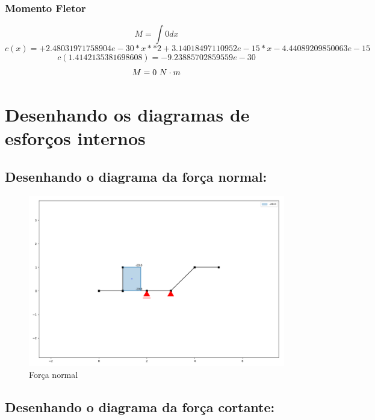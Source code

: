 \documentclass[a4paper,12pt]{article}%
\begin{document}
%
\subsubsection{Momento Fletor}%
\label{ssubsec:MomentoFletor}%
\begin{dmath*}%
M = \int0 dx%
\end{dmath*}%
\begin{dmath*}%
c(x) = +2.48031971758904e-30*x**2 + 3.14018497110952e-15*x - 4.44089209850063e-15%
\end{dmath*}%
\begin{dmath*}%
c(1.4142135381698608) = -9.23885702859559e-30%
\end{dmath*}%
\begin{dmath*}%
M = 0$ $N \cdot m%
\end{dmath*}

%
\section{Desenhando os diagramas de esforços internos}%
\label{sec:Desenhandoosdiagramasdeesforosinternos}%
\subsection{Desenhando o diagrama da força normal:}%
\label{subsec:Desenhandoodiagramadaforanormal}%


\begin{figure}[H]%
\centering%
\includegraphics[width=500px]{figs/axial}%
\caption{\label{fig:normais} Força normal}%
\end{figure}

%
\subsection{Desenhando o diagrama da força cortante:}%
\label{subsec:Desenhandoodiagramadaforacortante}%
\end{document}
